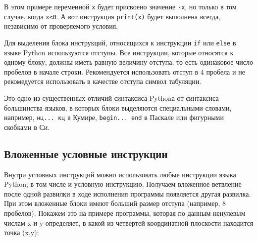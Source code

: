 В этом примере переменной \texttt{x} будет присвоено значение
\texttt{-x}, но только в том случае, когда \texttt{x\textless{}0}. А вот
инструкция \texttt{print(x)} будет выполнена всегда, независимо от
проверяемого условия.

Для выделения блока инструкций, относящихся к инструкции \texttt{if} или
\texttt{else} в языке Python используются отступы. Все инструкции,
которые относятся к одному блоку, должны иметь равную величину отступа,
то есть одинаковое число пробелов в начале строки. Рекомендуется
использовать отступ в 4 пробела и не рекомедуется использовать в
качестве отступа символ табуляции.

Это одно из существенных отличий синтаксиса Pythonа от синтаксиса
большинства языков, в которых блоки выделяются специальными словами,
например, \texttt{нц...\ кц} в Кумире, \texttt{begin...\ end} в Паскале
или фигурными скобками в Си.

\subsection{Вложенные условные
инструкции}\label{ux432ux43bux43eux436ux435ux43dux43dux44bux435-ux443ux441ux43bux43eux432ux43dux44bux435-ux438ux43dux441ux442ux440ux443ux43aux446ux438ux438}

Внутри условных инструкций можно использовать любые инструкции языка
Python, в том числе и условную инструкцию. Получаем вложенное ветвление
-- после одной развилки в ходе исполнения программы появляется другая
развилка. При этом вложенные блоки имеют больший размер отступа
(например, 8 пробелов). Покажем это на примере программы, которая по
данным ненулевым числам x и y определяет, в какой из четвертей
координатной плоскости находится точка (x,y):

\begin{Shaded}
\begin{Highlighting}[]
\OperatorTok{=} \NormalTok{(}\NormalTok{())}
\OperatorTok{=} \NormalTok{(}\NormalTok{())}
 \OperatorTok{>} \NormalTok{:}
     \OperatorTok{>} \NormalTok{:               }
        \NormalTok{(}\NormalTok{)}
    \NormalTok{:                   }
        \NormalTok{(}\NormalTok{)}
\NormalTok{:}
     \OperatorTok{>} \NormalTok{:               }
        \NormalTok{(}\NormalTok{)}
    \NormalTok{:                   }
        \NormalTok{(}\NormalTok{)}
\end{Highlighting}
\end{Shaded}

